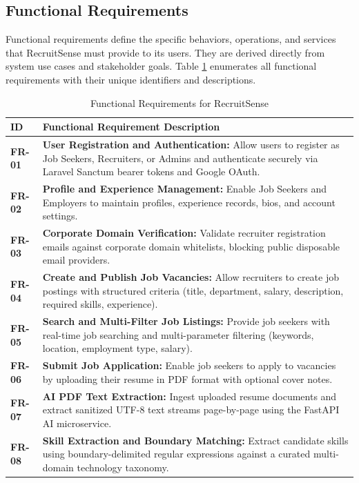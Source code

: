 \subsection{Functional Requirements}
Functional requirements define the specific behaviors, operations, and services that RecruitSense must provide to its users. They are derived directly from system use cases and stakeholder goals. Table \ref{tab:functional_reqs} enumerates all functional requirements with their unique identifiers and descriptions.

\begin{table}[H]
\centering
\small
\caption{Functional Requirements for RecruitSense}
\label{tab:functional_reqs}
\begin{tabular}{|l|p{12cm}|}
\hline
\textbf{ID} & \textbf{Functional Requirement Description} \\ \hline
\textbf{FR-01} & \textbf{User Registration and Authentication:} Allow users to register as Job Seekers, Recruiters, or Admins and authenticate securely via Laravel Sanctum bearer tokens and Google OAuth. \\ \hline
\textbf{FR-02} & \textbf{Profile and Experience Management:} Enable Job Seekers and Employers to maintain profiles, experience records, bios, and account settings. \\ \hline
\textbf{FR-03} & \textbf{Corporate Domain Verification:} Validate recruiter registration emails against corporate domain whitelists, blocking public disposable email providers. \\ \hline
\textbf{FR-04} & \textbf{Create and Publish Job Vacancies:} Allow recruiters to create job postings with structured criteria (title, department, salary, description, required skills, experience). \\ \hline
\textbf{FR-05} & \textbf{Search and Multi-Filter Job Listings:} Provide job seekers with real-time job searching and multi-parameter filtering (keywords, location, employment type, salary). \\ \hline
\textbf{FR-06} & \textbf{Submit Job Application:} Enable job seekers to apply to vacancies by uploading their resume in PDF format with optional cover notes. \\ \hline
\textbf{FR-07} & \textbf{AI PDF Text Extraction:} Ingest uploaded resume documents and extract sanitized UTF-8 text streams page-by-page using the FastAPI AI microservice. \\ \hline
\textbf{FR-08} & \textbf{Skill Extraction and Boundary Matching:} Extract candidate skills using boundary-delimited regular expressions against a curated multi-domain technology taxonomy. \\ \hline

\end{tabular}
\end{table}
